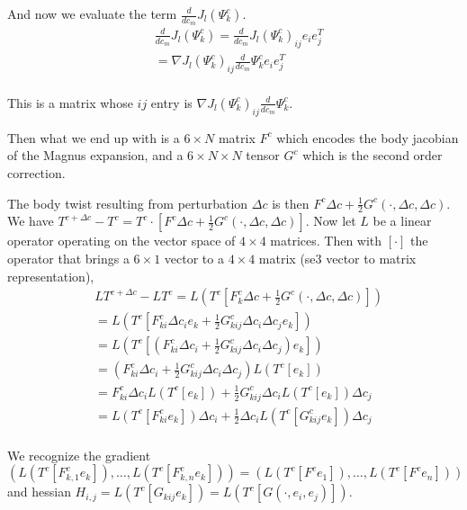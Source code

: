 \documentclass[12pt]{article}
\begin{document}
And now we evaluate the term $\frac{d}{dc_m}J_l(\Psi^c_k)$.
\[
  \begin{aligned}
    &\frac{d}{dc_m} J_l(\Psi^c_k) = \frac{d}{dc_m} J_l(\Psi^c_k)_{ij} e_i e_j^T \\
    &= \nabla J_l(\Psi^c_k)_{ij} \frac{d}{d c_m} \Psi^c_k e_i e_j^T \\
  \end{aligned}
\]

This is a matrix whose $ij$ entry is $\nabla J_l(\Psi^c_k)_{ij} \frac{d}{d c_m} \Psi^c_k$.


Then what we end up with is a $6 \times N$ matrix $F^c$ which encodes the body jacobian of the Magnus expansion,
and a $6 \times N \times N$ tensor $G^c$ which is the second order correction.

The body twist resulting from perturbation $\Delta c$ is then $F^c \Delta c + \frac{1}{2}  G^c(\cdot, \Delta c, \Delta c)$.
We have $T^{c + \Delta c} - T^c = T^c \cdot \left[F^c \Delta c + \frac{1}{2}  G^c(\cdot, \Delta c, \Delta c)\right]$.
Now let $L$ be a linear operator operating on the vector space of $4 \times 4$ matrices. Then with $[\cdot]$ the operator
that brings a $6 \times 1$ vector to a $4 \times 4$ matrix (se3 vector to matrix representation),
\[
\begin{aligned}
  &L T^{c + \Delta c} - L T^c = L\left(T^c  \left[F^c_k \Delta c + \frac{1}{2}  G^c(\cdot, \Delta c, \Delta c)\right]\right)\\
  &= L\left(T^c  \left[F^c_{ki} \Delta c_i e_k + \frac{1}{2}  G^c_{kij}\Delta c_i \Delta c_j e_k\right]\right)\\
  &= L\left(T^c  \left[(F^c_{ki} \Delta c_i  + \frac{1}{2}  G^c_{kij}\Delta c_i \Delta c_j) e_k\right]\right)\\
  &= (F^c_{ki} \Delta c_i  + \frac{1}{2}  G^c_{kij}\Delta c_i \Delta c_j) L\left(T^c [e_k]\right)\\
  &= F^c_{ki} \Delta c_i L\left(T^c [e_k]\right)  + \frac{1}{2}  G^c_{kij}\Delta c_iL\left(T^c [e_k]\right) \Delta c_j \\
  &=  L\left(T^c [F^c_{ki} e_k]\right)\Delta c_i  + \frac{1}{2}  \Delta c_iL\left(T^c [G^c_{kij} e_k]\right) \Delta c_j \\
  \end{aligned}
\]

We recognize the gradient $\left( L(T^c[F^c_{k,1} e_k]), \ldots, L(T^c[F^c_{k,n} e_k]) \right) = \left( L(T^c[F^c e_1]), \ldots, L(T^c[F^c e_n]) \right)$ and hessian $H_{i,j} = L\left(T^c[G_{kij}e_k]\right) = L\left(T^c[G(\cdot, e_i, e_j)]\right)$. 
\end{document}
